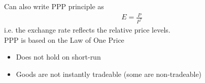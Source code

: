 \documentclass{beamer}
\begin{document}
\begin{frame}
  Can also write PPP principle as
  \begin{align}
    E=\frac{P}{P^*}
  \end{align}
  \medskip
  i.e. the exchange rate reflects the relative price levels.\\
  PPP is based on the Law of One Price
  \begin{itemize}
     \item Does not hold on short-run
     \item Goods are not instantly tradeable (some are non-tradeable)
  \end{itemize} 
\end{frame}

\end{document}
